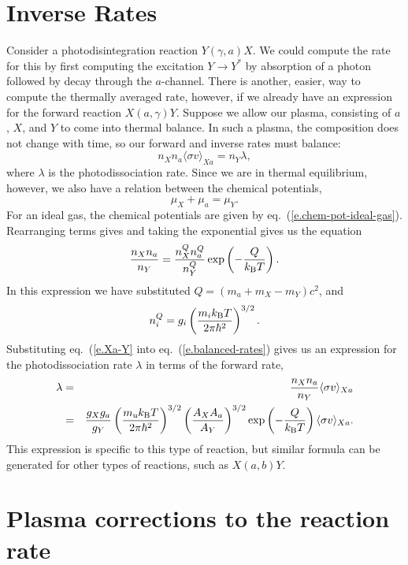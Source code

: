\section{Inverse Rates}\label{s.inverse-rates}

Consider a photodisintegration reaction $Y(\gamma,a)X$.  We could compute the rate for this by first computing the excitation $Y\to Y^{*}$ by absorption of a photon followed by decay through the $a$-channel.  There is another, easier, way to compute the thermally averaged rate, however, if we already have an expression for the forward reaction $X(a,\gamma)Y$.  Suppose we allow our plasma, consisting of $a$, $X$, and $Y$ to come into thermal balance.  In such a plasma, the composition does not change with time, so our forward and inverse rates must balance:
\begin{equation}\label{e.balanced-rates}
 n_{X}n_{a}\langle \sigma v \rangle_{Xa} = n_{Y}\lambda,
\end{equation}
where $\lambda$ is the photodissociation rate.  Since we are in thermal equilibrium, however, we also have a relation between the chemical potentials,
\[ \mu_{X} + \mu_{a} = \mu_{Y}. \]
For an ideal gas, the chemical potentials are given by eq.~(\ref{e.chem-pot-ideal-gas}). Rearranging terms gives and taking the exponential gives us the equation
\begin{equation}\label{e.Xa-Y}
	\frac{n_{X}n_{a}}{n_{Y}} = \frac{n^{Q}_{X}n^{Q}_{a}}{n^{Q}_{Y}}\exp\left(-\frac{Q}{k_\mathrm{B} T}\right).
\end{equation}
In this expression we have substituted $Q = (m_{a}+m_{X}-m_{Y})c^{2}$, and 
\[
	n^{Q}_{i} = g_{i}\left(\frac{m_{i}k_\mathrm{B} T}{2\pi\hbar^{2}}\right)^{3/2}.
\]
Substituting eq.~(\ref{e.Xa-Y} into eq.~(\ref{e.balanced-rates}) gives us an expression for the photodissociation rate $\lambda$ in terms of the forward rate,
\begin{eqnarray}
 \lambda &=& \frac{n_{X}n_{a}}{n_{Y}} \langle \sigma v \rangle_{Xa} \nonumber\\
 \label{e.inverse-from-balance}
 &=& \frac{g_{X}g_{a}}{g_{Y}} \left(\frac{m_\mathrm{u} k_\mathrm{B} T}{2\pi\hbar^{2}}\right)^{3/2} \left(\frac{A_{X}A_{a}}{A_{Y}}\right)^{3/2} \exp\left(-\frac{Q}{k_\mathrm{B} T}\right) \langle \sigma v \rangle_{Xa}.
\end{eqnarray}
This expression is specific to this type of reaction, but similar formula can be generated for other types of reactions, such as $X(a,b)Y$.

\section{Plasma corrections to the reaction rate}\label{s.correction-penetration}

